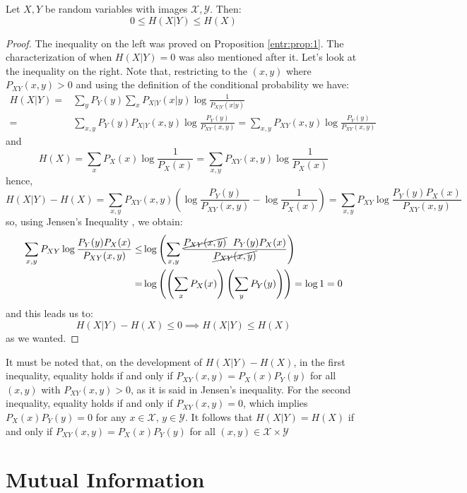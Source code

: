 \begin{nprop}\label{entr:prop:2}
Let $X,Y$ be random variables with images $\mathcal X, \mathcal Y$. Then:
$$
0 \leq H(X|Y) \leq H(X)
$$
\end{nprop}
\begin{proof}

The inequality on the left was proved on Proposition \ref{entr:prop:1}. The characterization of when $H(X|Y) = 0$ was also mentioned after it.  Let's look at the inequality on the right. Note that, restricting to the $(x,y)$ where $P_{XY}(x,y) > 0$ and using the definition of the conditional probability we have:
\begin{align*}
H(X|Y) = & \sum_y P_Y(y) \sum_x P_{X|Y}(x|y)\log \frac{1}{P_{X|Y}(x|y)}\\ = & \sum_{x,y} P_Y(y) P_{X|Y}(x,y) \log \frac{P_Y(y)}{P_{XY}(x,y)} = \sum_{x,y} P_{XY}(x,y)\log \frac{P_Y(y)}{P_{XY}(x,y)} 
\end{align*}
and 
$$
H(X) = \sum_x P_X(x) \log \frac{1}{P_X(x)} = \sum_{x,y}P_{XY}(x,y) \log \frac{1}{P_X(x)}
$$
hence,
$$
H(X|Y) - H(X) = \sum_{x,y}P_{XY}(x,y) \left( \log \frac{P_Y(y)}{P_{XY}(x,y)} - \log \frac{1}{P_X(x)}\right) = \sum_{x,y}P_{XY}\log \frac{P_Y(y)P_X(x)}{P_{XY}(x,y)}
$$
so, using Jensen's Inequality , we obtain:
\begin{align*}
\sum_{x,y}P_{XY}\log \frac{P_Y(y)P_X(x)}{P_{XY}(x,y)} \leq & \log \left( \sum_{x,y}\frac{ \cancel{P_{XY}(x,y)} \ \  P_Y(y) P_X(x)}{\cancel{P_{XY}(x,y)}} \right) \\ = & \log\left( \left( \sum_x P_X(x) \right) \left(\sum_y P_Y(y)\right)\right) = \log 1 = 0
\end{align*}
and this leads us to:
$$
H(X|Y) - H(X) \leq 0 \implies H(X|Y) \leq H(X)
$$
as we wanted.
\end{proof}

It must be noted that, on the development of $H(X|Y) - H(X)$, in the first inequality, equality holds if and only if $P_{XY}(x,y) = P_X(x) P_Y(y)$ for all $(x,y)$ with $P_{XY} (x,y) > 0$, as it is said in Jensen's inequality. For the second inequality, equality holds if and only if $P_{XY}(x,y) = 0$, which implies $P_X(x)P_Y(y) = 0$ for any $x\in \mathcal X$, $y \in \mathcal Y$. It follows that $H(X|Y) = H(X)$ if and only if $P_{XY}(x,y) = P_X(x)P_Y(y)$ for all $(x,y) \in \mathcal X \times \mathcal Y$

\section{Mutual Information}

